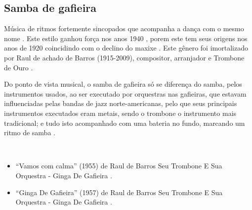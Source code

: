 \subsection{Samba de gafieira}
Música de ritmos fortemente sincopados que acompanha a dança com o mesmo nome \cite[pp. 291]{dourado2004dicionario}.
Este estilo ganhou força nos anos 1940 \cite[pp. 142]{perna2002samba} \cite[pp. 291]{dourado2004dicionario},
porem este tem seus origens nos anos de 1920 coincidindo com o declino do maxixe \cite[pp. 63]{reinato2010musica}.
Este gênero foi imortalizado por Raul de achado de Barros (1915-2009), 
compositor, arranjador e Trombone de Ouro \cite[pp. 63]{reinato2010musica}.

Do ponto de vista musical, o samba de gafieira só se diferença do samba, 
pelos instrumentos usados, ao ser executado por orquestras nas gafieiras,
que estavam influenciadas pelas bandas de jazz norte-americanas,
pelo que seus principais instrumentos executados eram metais, 
sendo o trombone o instrumento mais tradicional;
e tudo isto acompanhado com uma bateria no fundo, 
marcando um ritmo de samba \cite[pp. 131]{perna2002samba}.


\begin{example} ~

\begin{itemize}
\item ``Vamos com calma'' (1955) de  Raul de Barros Seu Trombone E Sua Orquestra - Ginga De Gafieira \cite{RaulDeBarrosMusic1}.
\item ``Ginga De Gafieira'' (1957) de  Raul de Barros Seu Trombone E Sua Orquestra - Ginga De Gafieira \cite{RaulDeBarrosMusic2}.
\end{itemize}
\end{example}

